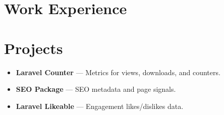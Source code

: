 \documentclass[11pt,a4paper]{article}
\begin{document}

\section*{Work Experience}

\section*{Projects}
\begin{itemize}
  \item \textbf{Laravel Counter} --- Metrics for views, downloads, and counters.
  \item \textbf{SEO Package} --- SEO metadata and page signals.
  \item \textbf{Laravel Likeable} --- Engagement likes/dislikes data.
\end{itemize}

\end{document}
